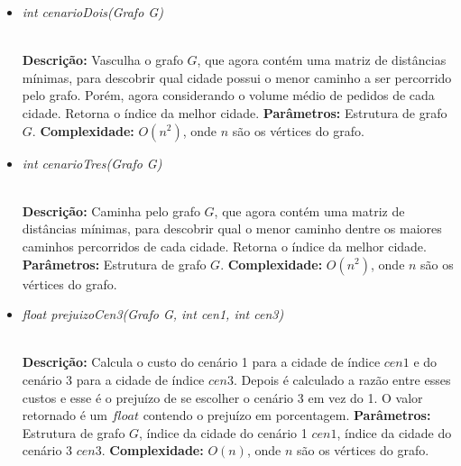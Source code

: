 \documentclass[12pt]{article}
\begin{document}
\vspace{0.2 true cm}

\begin{itemize}
 \item \begin{large}\textit{int cenarioDois(Grafo G)}\end{large}\\
 \subitem \textbf{Descrição:} Vasculha o grafo $G$, que agora contém uma matriz de distâncias mínimas, para descobrir qual cidade possui o menor caminho a ser percorrido pelo grafo. Porém, agora considerando o volume médio de pedidos de cada cidade. Retorna o índice da melhor cidade.
 \subitem \textbf{Parâmetros:} Estrutura de grafo $G$.
 \subitem \textbf{Complexidade:} $O(n^2)$, onde $n$ são os vértices do grafo.
\end{itemize}

\vspace{0.2 true cm}

\begin{itemize}
 \item \begin{large}\textit{int cenarioTres(Grafo G)}\end{large}\\
 \subitem \textbf{Descrição:} Caminha pelo grafo $G$, que agora contém uma matriz de distâncias mínimas, para descobrir qual o menor caminho dentre os maiores caminhos percorridos de cada cidade. Retorna o índice da melhor cidade.
 \subitem \textbf{Parâmetros:} Estrutura de grafo $G$.
 \subitem \textbf{Complexidade:} $O(n^2)$, onde $n$ são os vértices do grafo.
\end{itemize}

\vspace{0.2 true cm}

\begin{itemize}
 \item \begin{large}\textit{float prejuizoCen3(Grafo G, int cen1, int cen3)}\end{large}\\
 \subitem \textbf{Descrição:} Calcula o custo do cenário 1 para a cidade de índice $cen1$ e do cenário 3 para a cidade de índice $cen3$. Depois é calculado a razão entre esses custos e esse é o prejuízo de se escolher o cenário 3 em vez do 1. O valor retornado é um $float$ contendo o prejuízo em porcentagem.
 \subitem \textbf{Parâmetros:} Estrutura de grafo $G$, índice da cidade do cenário 1 $cen1$, índice da cidade do cenário 3 $cen3$.
 \subitem \textbf{Complexidade:} $O(n)$, onde $n$ são os vértices do grafo.
\end{itemize}
\end{document}

